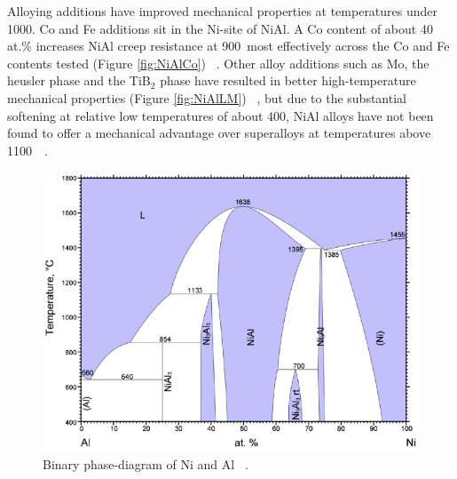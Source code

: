 Alloying additions have improved mechanical properties at temperatures under 1000\celsius.  Co and Fe additions sit in the Ni-site of NiAl.  A Co content of about 40 at.\% increases NiAl creep resistance at 900\celsius\ most effectively across the Co and Fe contents tested (Figure \ref{fig:NiAlCo}) ~\cite{jung87}.  Other alloy additions such as Mo, the heusler phase and the TiB$_2$ phase have resulted in better high-temperature mechanical properties (Figure \ref{fig:NiAlLM}) ~\cite{miracle94a, walston93, darolia93, polvani76}, but due to the substantial softening at relative low temperatures of about 400\celsius, NiAl alloys have not been found to offer a mechanical advantage over superalloys at temperatures above 1100\celsius\ ~\cite{miracle94a}.
%
\begin{figure}[H]
\begin{center}
\includegraphics[width=14cm]{NiAl}
\caption{Binary phase-diagram of Ni and Al ~\cite{okamoto93}.}
\label{fig:NiAl}
\end{center}
\end{figure}
%
%
